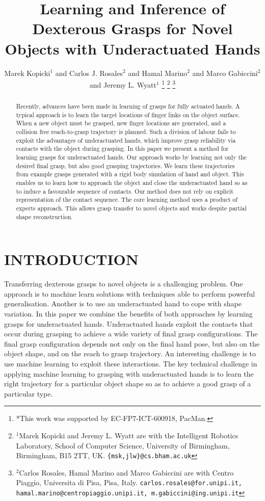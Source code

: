 \documentclass[a4paper, 10pt, conference]{ieeeconf}      %
\title{\LARGE \bf
Learning and Inference of Dexterous Grasps for Novel Objects with Underactuated Hands
}
\author{Marek Kopicki$^{1}$ and Carlos J. Rosales$^{2}$ and Hamal Marino$^{2}$ and Marco Gabiccini$^{2}$ and Jeremy L. Wyatt$^{1}$%
\thanks{*This work was supported by EC-FP7-ICT-600918, PacMan.}%
\thanks{$^{1}$Marek Kopicki and Jeremy L. Wyatt are with the Intelligent Robotics Laboratory, School of Computer Science,
        University of Birmingham, Birmingham, B15 2TT, UK.
        {\tt\small \{msk,jlw\}@cs.bham.ac.uk}}%
\thanks{$^{2}$Carlos Rosales, Hamal Marino and Marco Gabiccini are with Centro Piaggio, Universita di Pisa, Pisa, Italy.
               {\tt\small carlos.rosales@for.unipi.it, hamal.marino@centropiaggio.unipi.it, m.gabiccini@ing.unipi.it}}%
}
\begin{document}
\maketitle
\thispagestyle{empty}
\pagestyle{empty}


\begin{abstract}
Recently, advances have been made in learning of grasps for fully actuated hands. A typical approach is to learn the target locations of finger links on the object surface. When a new object must be grasped, new finger locations are generated, and a collision free reach-to-grasp trajectory is planned. Such a division of labour fails to exploit the advantages of underactuated hands, which improve grasp reliability via contacts with the object during grasping. In this paper we present a method for learning grasps for underactuated hands. Our approach works by learning not only the desired final grasp, but also good grasping trajectories. We learn these trajectories from example grasps generated with a rigid body simulation of hand and object. This enables us to learn how to approach the object and close the underactuated hand so as to induce a favourable sequence of contacts. Our method does not rely on explicit representation of the contact sequence. The core learning method uses a product of experts approach. This allows grasp transfer to novel objects and works despite partial shape reconstruction.


\end{abstract}


\section{INTRODUCTION}

Transferring dexterous grasps to novel objects is a challenging problem. One approach is to machine learn solutions with techniques able to perform powerful generalisation. Another is to use an underactuated hand to cope with shape variation. In this paper we combine the benefits of both approaches by learning grasps for underactuated hands. Underactuated hands exploit the contacts that occur during grasping to achieve a wide variety of final grasp configurations. The final grasp configuration depends not only on the final hand pose, but also on the object shape, and on the reach to grasp trajectory. An interesting challenge is to use machine learning to exploit these interactions. The key technical challenge in applying machine learning to grasping with underactuated hands is to learn the right trajectory for a particular object shape so as to achieve a good grasp of a particular type. 
\end{document}
